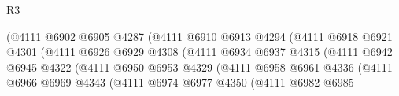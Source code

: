 \begin{lexlean}{R3}
\begin{coremodule}
                                            (@4111
                                              @6902
                                              @6905
                                              @4287
                                              (@4111
                                                @6910
                                                @6913
                                                @4294
                                                (@4111
                                                  @6918
                                                  @6921
                                                  @4301
                                                  (@4111
                                                    @6926
                                                    @6929
                                                    @4308
                                                    (@4111
                                                      @6934
                                                      @6937
                                                      @4315
                                                      (@4111
                                                        @6942
                                                        @6945
                                                        @4322
                                                        (@4111
                                                          @6950
                                                          @6953
                                                          @4329
                                                          (@4111
                                                            @6958
                                                            @6961
                                                            @4336
                                                            (@4111
                                                              @6966
                                                              @6969
                                                              @4343
                                                              (@4111
                                                                @6974
                                                                @6977
                                                                @4350
                                                                (@4111
                                                                  @6982
                                                                  @6985

\end{coremodule}
\end{lexlean}
